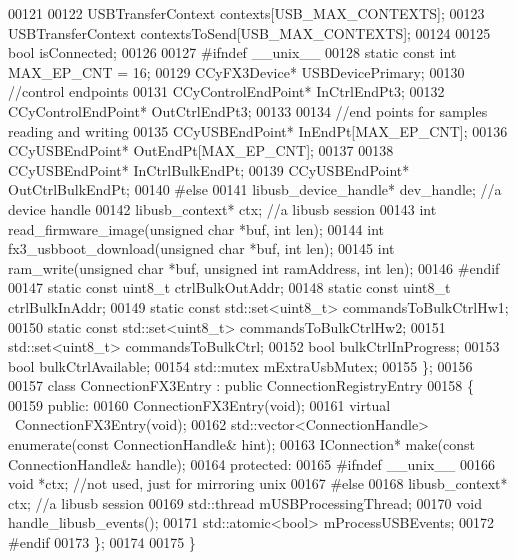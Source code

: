 \begin{DoxyCode}
00121     
00122     USBTransferContext contexts[USB\_MAX\_CONTEXTS];
00123     USBTransferContext contextsToSend[USB\_MAX\_CONTEXTS];
00124 
00125     \textcolor{keywordtype}{bool} isConnected;
00126 
00127 \textcolor{preprocessor}{#ifndef \_\_unix\_\_}
00128     \textcolor{keyword}{static} \textcolor{keyword}{const} \textcolor{keywordtype}{int} MAX\_EP\_CNT = 16;
00129     CCyFX3Device* USBDevicePrimary;
00130     \textcolor{comment}{//control endpoints}
00131     CCyControlEndPoint* InCtrlEndPt3;
00132     CCyControlEndPoint* OutCtrlEndPt3;
00133 
00134     \textcolor{comment}{//end points for samples reading and writing}
00135     CCyUSBEndPoint* InEndPt[MAX\_EP\_CNT];
00136     CCyUSBEndPoint* OutEndPt[MAX\_EP\_CNT];
00137 
00138     CCyUSBEndPoint* InCtrlBulkEndPt;
00139     CCyUSBEndPoint* OutCtrlBulkEndPt;
00140 \textcolor{preprocessor}{#else}
00141     libusb\_device\_handle* dev\_handle; \textcolor{comment}{//a device handle}
00142     libusb\_context* ctx; \textcolor{comment}{//a libusb session}
00143     \textcolor{keywordtype}{int} read\_firmware\_image(\textcolor{keywordtype}{unsigned} \textcolor{keywordtype}{char} *buf, \textcolor{keywordtype}{int} len);
00144     \textcolor{keywordtype}{int} fx3\_usbboot\_download(\textcolor{keywordtype}{unsigned} \textcolor{keywordtype}{char} *buf, \textcolor{keywordtype}{int} len);
00145     \textcolor{keywordtype}{int} ram\_write(\textcolor{keywordtype}{unsigned} \textcolor{keywordtype}{char} *buf, \textcolor{keywordtype}{unsigned} \textcolor{keywordtype}{int} ramAddress, \textcolor{keywordtype}{int} len);
00146 \textcolor{preprocessor}{#endif}
00147     \textcolor{keyword}{static} \textcolor{keyword}{const} uint8\_t ctrlBulkOutAddr;
00148     \textcolor{keyword}{static} \textcolor{keyword}{const} uint8\_t ctrlBulkInAddr;
00149     \textcolor{keyword}{static} \textcolor{keyword}{const} std::set<uint8\_t> commandsToBulkCtrlHw1;
00150     \textcolor{keyword}{static} \textcolor{keyword}{const} std::set<uint8\_t> commandsToBulkCtrlHw2;
00151     std::set<uint8\_t> commandsToBulkCtrl;
00152     \textcolor{keywordtype}{bool} bulkCtrlInProgress;
00153     \textcolor{keywordtype}{bool} bulkCtrlAvailable;
00154     std::mutex mExtraUsbMutex;
00155 \};
00156 
00157 \textcolor{keyword}{class }ConnectionFX3Entry : \textcolor{keyword}{public} ConnectionRegistryEntry
00158 \{
00159 \textcolor{keyword}{public}:
00160     ConnectionFX3Entry(\textcolor{keywordtype}{void});
00161     \textcolor{keyword}{virtual} ~ConnectionFX3Entry(\textcolor{keywordtype}{void});
00162     std::vector<ConnectionHandle> enumerate(\textcolor{keyword}{const} ConnectionHandle& hint);
00163     IConnection* make(\textcolor{keyword}{const} ConnectionHandle& handle);
00164 \textcolor{keyword}{protected}:
00165 \textcolor{preprocessor}{#ifndef \_\_unix\_\_}
00166     \textcolor{keywordtype}{void} *ctx; \textcolor{comment}{//not used, just for mirroring unix}
00167 \textcolor{preprocessor}{#else}
00168     libusb\_context* ctx; \textcolor{comment}{//a libusb session}
00169     std::thread mUSBProcessingThread;
00170     \textcolor{keywordtype}{void} handle\_libusb\_events();
00171     std::atomic<bool> mProcessUSBEvents;
00172 \textcolor{preprocessor}{#endif}
00173 \};
00174 
00175 \}
\end{DoxyCode}
